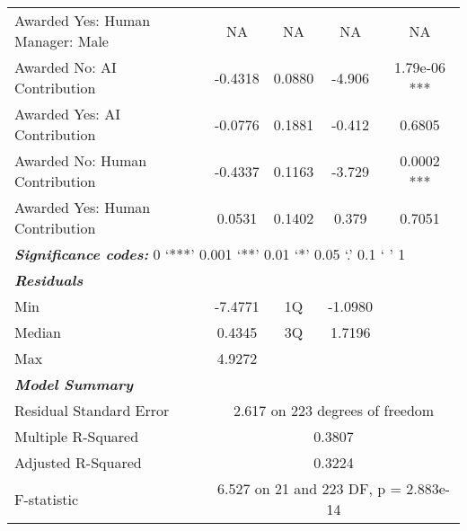 \begin{table}[ht]
\begin{tabular}{lcccc}
        Awarded Yes: Human Manager: Male & NA  & NA  & NA  & NA  \\
        Awarded No: AI Contribution & -0.4318  & 0.0880  & -4.906  & 1.79e-06 ***  \\
        Awarded Yes: AI Contribution & -0.0776  & 0.1881  & -0.412  & 0.6805  \\
        Awarded No: Human Contribution & -0.4337  & 0.1163  & -3.729  & 0.0002 ***  \\
        Awarded Yes: Human Contribution & 0.0531  & 0.1402  & 0.379  & 0.7051  \\
        \midrule
        \multicolumn{5}{l}{\textbf{\textit{Significance codes:}} 0 ‘***’ 0.001 ‘**’ 0.01 ‘*’ 0.05 ‘.’ 0.1 ‘ ’ 1} \\
        \midrule
        \textbf{\textit{Residuals}} & \multicolumn{4}{c}{} \\
        Min & -7.4771 & 1Q & -1.0980 &  \\
        Median & 0.4345 & 3Q & 1.7196 &  \\
        Max & 4.9272 &  &  &  \\
        \midrule
        \textbf{\textit{Model Summary}}\\
        Residual Standard Error & \multicolumn{4}{c}{2.617 on 223 degrees of freedom} \\
        Multiple R-Squared & \multicolumn{4}{c}{0.3807} \\
        Adjusted R-Squared & \multicolumn{4}{c}{0.3224} \\
        F-statistic & \multicolumn{4}{c}{6.527 on 21 and 223 DF, p = 2.883e-14} \\
        \bottomrule
    \end{tabular}
    \label{tab:regression_willingness_male}
\end{table}



\clearpage
%
%

%




